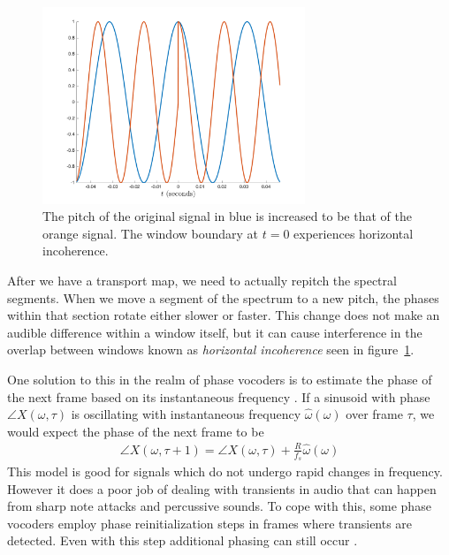 \documentclass[12pt]{article}
\begin{document}
\begin{figure}[!h]
  \begin{center}
  \includegraphics[width=0.7\textwidth]{figures/HorizontalIncoherence0}
  \caption{%
    The pitch of the original signal in blue is increased to be that of the orange signal.
  The window boundary at $t = 0$ experiences horizontal incoherence.}
  \label{fig:horizontalincoherence}
\end{center}
\end{figure}

After we have a transport map, we need to actually repitch the spectral segments.
When we move a segment of the spectrum to a new pitch, 
the phases within that section rotate either slower or faster.
This change does not make an audible difference within a window itself,
but it can cause interference in the overlap between windows known as \emph{horizontal incoherence} seen in figure~\ref{fig:horizontalincoherence}.

One solution to this in the realm of phase vocoders is to estimate the phase of the next frame based on its instantaneous frequency
\cite{vocoder}.
If a sinusoid with phase $\angle X(\omega, \tau)$ 
is oscillating with instantaneous frequency $\hat{\omega}(\omega)$ over frame $\tau$, we would expect the phase of the next frame to be
\begin{align}
  \angle X(\omega, \tau+1) = 
  \angle X(\omega,\tau) + \frac{R}{f_s}\hat{\omega}(\omega)
\end{align}
This model is good for signals which do not undergo rapid changes in frequency. 
However it does a poor job of dealing with transients in audio that can happen from sharp note attacks and percussive sounds. 
To cope with this, some phase vocoders employ phase reinitialization steps in frames where transients are detected.
Even with this step additional phasing can still occur
\cite{vocoder}.
\end{document}
